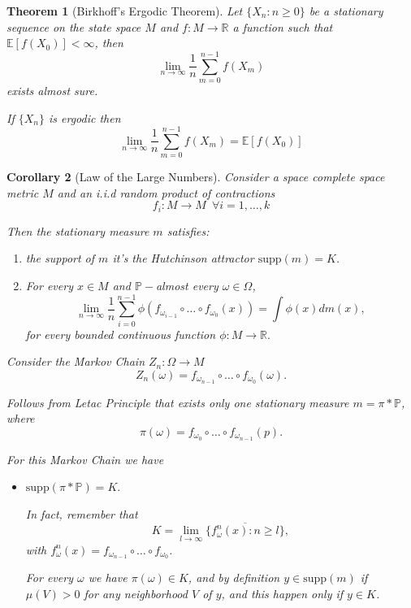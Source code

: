 \documentclass[a4paper]{article}
\theoremstyle{plain}
\newtheorem{theorem}{Theorem}[section] %
\newtheorem{corollary}[theorem]{Corollary}
\theoremstyle{definition}
\begin{document}
    \begin{theorem}[Birkhoff's Ergodic Theorem] Let $\{X_n: n \geq 0\}$ be a stationary sequence on the state space $M$ and $f:M \to \mathbb R$ a function such that $\mathbb E [f(X_0)] < \infty$, then 
    $$\lim_{n \to \infty} \dfrac{1}{n} \sum_{m=0}^{n-1} f(X_m)$$
    exists almost sure. 

    If $\{X_n\}$ is ergodic then 
    $$\lim_{n \to \infty} \dfrac{1}{n} \sum_{m=0}^{n-1} f(X_m) = \mathbb E [f(X_0)] $$
        
    \end{theorem}
    \begin{corollary}[Law of the Large Numbers] Consider a space complete space metric $M$ and an i.i.d random product of contractions 
    $$f_i:M\to M\,\,\,\forall i=1,\dots,k$$

    Then the stationary measure $m$ satisfies: 
    \begin{enumerate}
        \item the support of $m$ it's the Hutchinson attractor $\text{supp}(m) = K$. 
        \item For every $x \in M$ and $\mathbb{P}-$almost every $\omega \in \Omega$, 
        $$ \lim_{n \to \infty} \dfrac{1}{n} \sum_{i=0}^{n-1} \phi( f_{\omega_{i-1}} \circ \dots \circ f_{\omega_0}(x)) = \int \phi(x)dm(x),$$
        for every bounded continuous function $\phi:M \to \mathbb{R}.$
    \end{enumerate}

    \proof Consider the Markov Chain $Z_n:\Omega \to M$
    $$Z_n(\omega) = f_{\omega_{n-1}}\circ \dots \circ f_{\omega_{0}}(\omega).$$

    Follows from Letac Principle that exists only one stationary measure $m = \pi * \mathbb{P}$, where 
    $$ \pi(\omega) = f_{\omega_{0}}\circ \dots \circ f_{\omega_{n-1}}(p).$$

    For this Markov Chain we have 
    \begin{itemize}
        \item $\text{supp}(\pi * \mathbb{P}) = K.$

        In fact, remember that
        $$K = \lim_{l \to \infty} \overline{\{f^{n}_\omega(x): n \geq l\}},$$
with $f^{n}_\omega(x) = f_{\omega_{n-1}}\circ \dots \circ f_{\omega_{0}}$.

    For  every $\omega$ we have $\pi(\omega) \in K$, and by definition $y \in \text{supp}(m)$ if $\mu(V) > 0$ for any neighborhood $V$ of $y$, and this happen only if $y \in K$.


\end{itemize}
\end{corollary}
\end{document}
